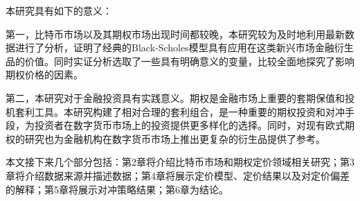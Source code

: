 \par{本研究具有如下的意义：}
\par{
  第一，比特币市场以及其期权市场出现时间都较晚，本研究较为及时地利用最新数据进行了分析，证明了经典的Black-Scholes模型具有应用在这类新兴市场金融衍生品的价值。同时实证分析选取了一些具有明确意义的变量，比较全面地探究了影响期权价格的因素。
}
\par{
  第二，本研究对于金融投资具有实践意义。期权是金融市场上重要的套期保值和投机套利工具。本研究构建了相对合理的套利组合，是一种重要的期权投资和对冲手段，为投资者在数字货币市场上的投资提供更多样化的选择。同时，对现有欧式期权的研究也为金融机构在数字货币市场上推出更复杂的衍生品提供了参考。
}
\par{本文接下来几个部分包括：第2章将介绍比特币市场和期权定价领域相关研究；第3章将介绍数据来源并描述数据；第4章将展示定价模型、定价结果以及对定价偏差的解释；第5章将展示对冲策略结果；第6章为结论。}
